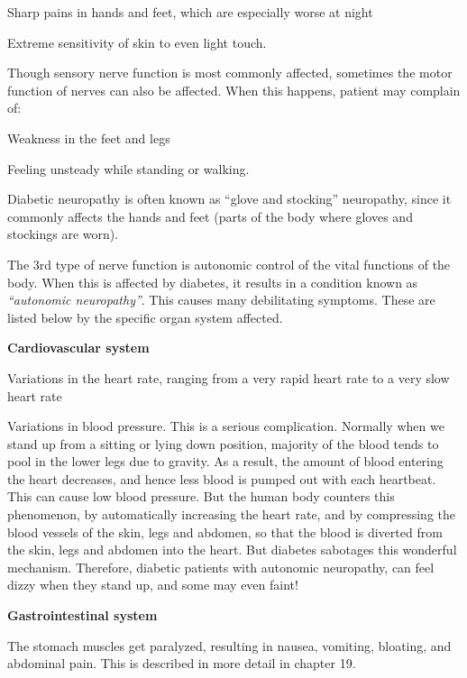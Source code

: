  \item Sharp pains in hands and feet, which are especially worse at night

 \item Extreme sensitivity of skin to even light touch.

Though sensory nerve function is most commonly affected, sometimes the motor function of nerves can also be affected. When this happens, patient may complain of:

\item Weakness in the feet and legs

 \item Feeling unsteady while standing or walking.

Diabetic neuropathy is often known as “glove and stocking” neuropathy, since it commonly affects the hands and feet (parts of the body where gloves and stockings are worn).

The 3rd type of nerve function is autonomic control of the vital functions of the body. When this is affected by diabetes, it results in a condition known as \textit{“autonomic neuropathy”}. This causes many debilitating symptoms. These are listed below by the specific organ system affected.

\item \textbf{Cardiovascular system}
 \item Variations in the heart rate, ranging from a very rapid heart rate to a very slow heart rate

 \item Variations in blood pressure. This is a serious complication. Normally when we stand up from a sitting or lying down position, majority of the blood tends to pool in the lower legs due to gravity. As a result, the amount of blood entering the heart decreases, and hence less blood is pumped out with each heartbeat. This can cause low blood pressure. But the human body counters this phenomenon, by automatically increasing the heart rate, and by compressing the blood vessels of the skin, legs and abdomen, so that the blood is diverted from the skin, legs and abdomen into the heart. But diabetes sabotages this wonderful mechanism. Therefore, diabetic patients with autonomic neuropathy, can feel dizzy when they stand up, and some may even faint!


 \item \textbf{Gastrointestinal system}
 \item The stomach muscles get paralyzed, resulting in nausea, vomiting, bloating, and abdominal pain. This is described in more detail in chapter 19.

